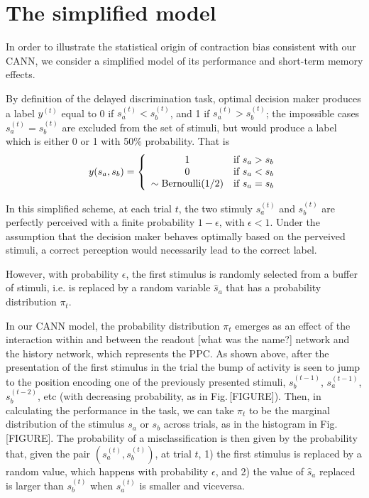 \documentclass[aps,pre,reprint,onecolumn,notitlepage,superscriptaddress,nofootinbib]{revtex4-2}
\begin{document}
	\section{The simplified model}

	In order to illustrate the statistical origin of contraction bias consistent with our CANN, we consider a simplified model of its performance and short-term memory effects.

	By definition of the delayed discrimination task, optimal decision maker produces a label $y^{(t)}$ equal to 0 if $s_a^{(t)} < s_b^{(t)}$, and 1 if $s_a^{(t)} > s_b^{(t)}$; the impossible cases $s_a^{(t)} = s_b^{(t)}$ are excluded from the set of stimuli, but would produce a label which is either 0 or 1 with 50\% probability. That is
	\begin{equation}
		y(s_a, s_b) = \left\{
			\begin{array}{cl}
				1 & \mbox{if } s_a > s_b \\
				0 & \mbox{if } s_a < s_b \\
				\sim {\rm Bernoulli}(1/2) & \mbox{if } s_a = s_b
			\end{array}
		\right.
	\end{equation}

	In this simplified scheme, at each trial $t$, the two stimuly $s_a^{(t)}$ and $s_b^{(t)}$ are perfectly perceived with a finite probability $1 - \epsilon$, with $\epsilon < 1$.
	Under the assumption that the decision maker behaves optimally based on the perveived stimuli, a correct perception would necessarily lead to the correct label.

	However, with probability $\epsilon$, the first stimulus is randomly selected from a buffer of stimuli, i.e. is replaced by a random variable $\hat{s}_a$ that has a probability distribution $\pi_t$.
	

	In our CANN model, the probability distribution $\pi_t$ emerges as an effect of the interaction within and between the readout {\color{red}[what was the name?]} network and the history network, which represents the PPC.
	As shown above, after the presentation of the first stimulus in the trial the bump of activity is seen to jump to the position encoding one of the previously presented stimuli, $s_b^{(t-1)}$, $s_a^{(t-1)}$, $s_b^{(t-2)}$, etc (with decreasing probability, as in Fig.\,[FIGURE]).
	Then, in calculating the performance in the task, we can take $\pi_t$ to be the marginal distribution of the stimulus $s_a$ or $s_b$ across trials, as in the histogram in Fig.\,[FIGURE].
	The probability of a misclassification is then given by the probability that, given the pair $(s_a^{(t)},s_b^{(t)})$, at trial $t$, 1) the first stimulus is replaced by a random value, which happens with probability $\epsilon$, and 2) the value of $\hat{s}_a$ replaced is larger than $s_b^{(t)}$ when $s_a^{(t)}$ is smaller and viceversa.
\end{document}
